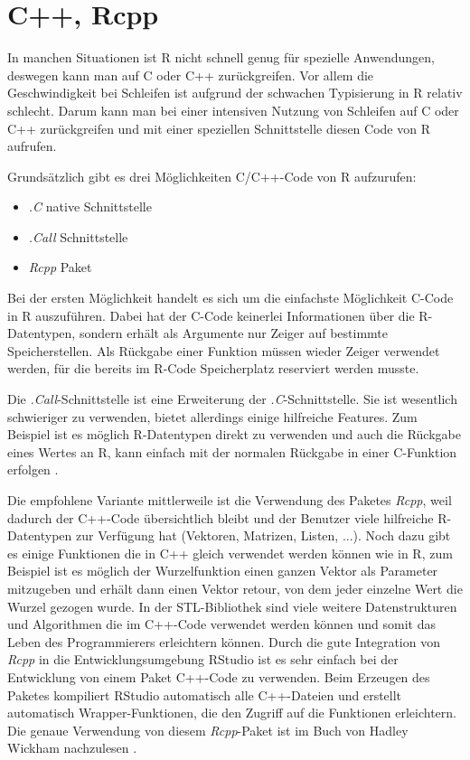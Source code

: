 \section{C++, Rcpp}
\label{sec:Rcpp}
In manchen Situationen ist R nicht schnell genug für spezielle Anwendungen, deswegen kann man auf C oder C++ zurückgreifen. Vor allem die Geschwindigkeit bei Schleifen ist aufgrund der schwachen Typisierung in R relativ schlecht. Darum kann man bei einer intensiven Nutzung von Schleifen auf C oder C++ zurückgreifen und mit einer speziellen Schnittstelle diesen Code von R aufrufen.

Grundsätzlich gibt es drei Möglichkeiten C/C++-Code von R aufzurufen:
\begin{itemize}
	\item \emph{.C} native Schnittstelle
	\item \emph{.Call} Schnittstelle
	\item \emph{Rcpp} Paket
\end{itemize}

Bei der ersten Möglichkeit handelt es sich um die einfachste Möglichkeit C-Code in R auszuführen. Dabei hat der C-Code keinerlei Informationen über die R-Datentypen, sondern erhält als Argumente nur Zeiger auf bestimmte Speicherstellen. Als Rückgabe einer Funktion müssen wieder Zeiger verwendet werden, für die bereits im R-Code Speicherplatz reserviert werden musste.

Die \emph{.Call}-Schnittstelle ist eine Erweiterung der \emph{.C}-Schnittstelle. Sie ist wesentlich schwieriger zu verwenden, bietet allerdings einige hilfreiche Features. Zum Beispiel ist es möglich R-Datentypen direkt zu verwenden und auch die Rückgabe eines Wertes an R, kann einfach mit der normalen Rückgabe in einer C-Funktion erfolgen \cite{wickham2015r}.

Die empfohlene Variante mittlerweile ist die Verwendung des Paketes \emph{Rcpp}, weil dadurch der C++-Code übersichtlich bleibt und der Benutzer viele hilfreiche R-Datentypen zur Verfügung hat (Vektoren, Matrizen, Listen, ...). Noch dazu gibt es einige Funktionen die in C++ gleich verwendet werden können wie in R, zum Beispiel ist es möglich der Wurzelfunktion einen ganzen Vektor als Parameter mitzugeben und erhält dann einen Vektor retour, von dem jeder einzelne Wert die Wurzel gezogen wurde. In der STL-Bibliothek sind viele weitere Datenstrukturen und Algorithmen die im C++-Code verwendet werden können und somit das Leben des Programmierers erleichtern können. Durch die gute Integration von \emph{Rcpp} in die Entwicklungsumgebung RStudio ist es sehr einfach bei der Entwicklung von einem Paket C++-Code zu verwenden. Beim Erzeugen des Paketes kompiliert RStudio automatisch alle C++-Dateien und erstellt automatisch Wrapper-Funktionen, die den Zugriff auf die Funktionen erleichtern. Die genaue Verwendung von diesem \emph{Rcpp}-Paket ist im Buch von Hadley Wickham nachzulesen \cite{wickham2015advanced}. 

